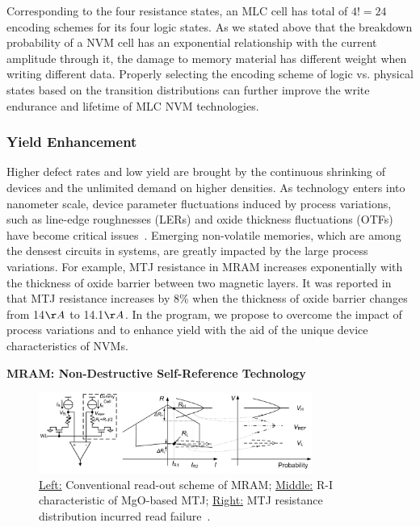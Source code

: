 Corresponding to the four resistance states, an MLC cell has total of $4! = 24$ encoding schemes for its four logic states. As we stated above that the breakdown probability of a NVM cell has an exponential relationship with the current amplitude through it, the damage to memory material has different weight when writing different data. Properly selecting the encoding scheme of logic vs. physical states based on the transition distributions can further improve the write endurance and lifetime of MLC NVM technologies. 

\subsubsection{Yield Enhancement}
Higher defect rates and low yield are brought by the continuous shrinking of devices and the unlimited demand on higher densities. As technology enters into nanometer scale, device parameter fluctuations induced by process variations, such as line-edge roughnesses (LERs) and oxide thickness fluctuations (OTFs) have become critical issues~\cite{Asenov03}. Emerging non-volatile memories, which are among the densest circuits in systems, are greatly impacted by the large process variations. For example, MTJ resistance in MRAM increases exponentially with the thickness of oxide barrier between two magnetic layers. It was reported in~\cite{Tehrani00} that MTJ resistance increases by 8\% when the thickness of oxide barrier changes from 14${\AA}$ to 14.1${\AA}$. In the program, we propose to overcome the impact of process variations and to enhance yield with the aid of the unique device characteristics of NVMs.

\squishlist \item {\textbf{MRAM: Non-Destructive Self-Reference Technology}} \squishend

\begin{figure}
\centering
\vspace{-10pt}
\includegraphics[width=0.8\textwidth]{./figure/5_selfref.pdf}
\vspace{-10pt}
\caption{\underline{Left:} Conventional read-out scheme of MRAM; \underline{Middle:} R-I characteristic of MgO-based MTJ; \underline{Right:} MTJ resistance distribution incurred read failure~\cite{Li09}.}
\label{selfref}
\vspace{-10pt}
\end{figure}

